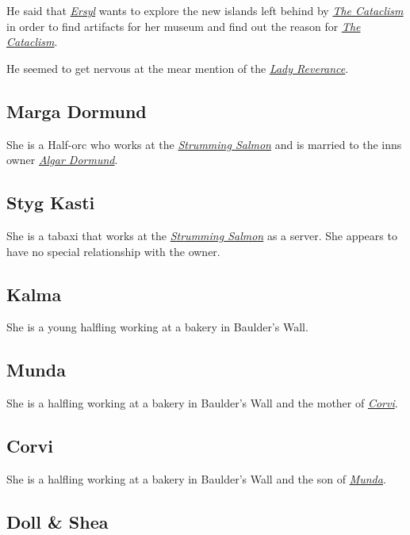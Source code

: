 \documentclass{article}
\begin{document}
\begin{multicols}{2}
    He said that \hyperref[ersyl]{\textit{Ersyl}} wants to explore the new islands left behind by \hyperref[cataclism]{\textit{The Cataclism}} in order to find artifacts for her museum and find out the reason for
    \hyperref[cataclism]{\textit{The Cataclism}}.

    He seemed to get nervous at the mear mention of the \hyperref[gullsinger]{\textit{Lady Reverance}}.

    \subsection{Marga Dormund}
    \label{marga}

    She is a Half-orc who works at the \hyperref[strumming_salmon]{\textit{Strumming Salmon}} and is married to the inns owner \hyperref[algar]{\textit{Algar Dormund}}.

    \subsection{Styg Kasti}
    \label{styg}

    She is a tabaxi that works at the \hyperref[strumming_salmon]{\textit{Strumming Salmon}} as a server. She appears to have no special relationship with the owner.

    \subsection{Kalma}
    \label{kalma}

    She is a young halfling working at a bakery in Baulder's Wall.

    \subsection{Munda}
    \label{munda}

    She is a halfling working at a bakery in Baulder's Wall and the mother of \hyperref[corvi]{\textit{Corvi}}.

    \subsection{Corvi}
    \label{corvi}

    She is a halfling working at a bakery in Baulder's Wall and the son of \hyperref[munda]{\textit{Munda}}.

    \subsection{Doll \& Shea}
    \label{doll_shea}


\end{multicols}
\end{document}
